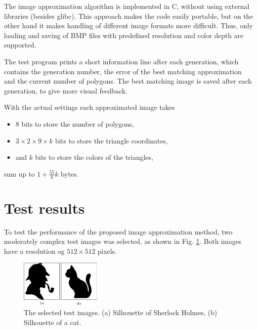 \documentclass[conference]{IEEEtran}
\begin{document}
The image approximation algorithm is implemented in C,
without using external libraries (besides glibc). This
approach makes the code easily portable, but on the other
hand it makes handling of different image formats more
difficult. Thus, only loading and saving of BMP files
with predefined resolution and color depth are supported.

The test program prints a short information line after
each generation, which contains the generation number,
the error of the best matching approximation and the
current number of polygons. The best matching image is
saved after each generation, to give more visual feedback.

With the actual settings each approximated image takes

\begin{itemize}

\item{8 bits to store the number of polygons,}

\item{$3 \times 2 \times 9 \times k$ bits to store the triangle
coordinates,}

\item{and $k$ bits to store the colors of the triangles,}

\end{itemize}

sum up to $1+\frac{55}{8}k$ bytes.

\section{Test results}

To test the performance of the proposed image approximation
method, two moderately complex test images was selected,
as shown in Fig. \ref{fig-orig}. Both images have a
resolution og $512 \times 512$ pixels.

\begin{figure}[htbp]
	\centering
	\includegraphics[width=0.35\textwidth]{fig/originals.png}
	\caption{The selected test images.
	(a) Silhouette of Sherlock Holmes,
	(b) Silhouette of a cat.}
	\label{fig-orig}
\end{figure}
\end{document}
